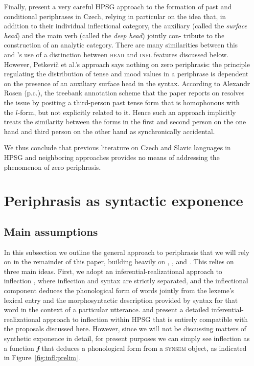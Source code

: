 \documentclass[output=paper]{langsci/langscibook}
\begin{document}
Finally, \citet{Petkevic15} present a very careful HPSG approach to the formation of past and conditional periphrases in Czech, relying in particular on the idea that, in addition to their individual inflectional category, the auxiliary (called the \emph{surface head}) and the main verb (called the \emph{deep head}) jointly con- tribute to the construction of an analytic category. There are many similarities between this and \citeauthor{Bonami14d}’s \citeyear{Bonami14d} use of a distinction between \textsc{head} and \textsc{infl} features discussed below. However,  Petkevič et al.’s approach  says nothing on zero periphrasis: the principle regulating the distribution of tense and mood values in a periphrase is dependent on the presence of an auxiliary surface head in the syntax. According to Alexandr Rosen (p.c.), the treebank annotation scheme that the paper reports on resolves the issue by positing a third-person past tense form that is homophonous with the $l$-form, but not explicitly related to it. Hence such an approach implicitly treats the similarity  between the forms in the first and second person on the one hand and third person on the other hand as synchronically accidental. 

We thus conclude that previous literature on Czech and Slavic languages in HPSG and neighboring approaches provides no means of addressing the phenomenon of zero periphrasis.

\section{Periphrasis as syntactic exponence}
\label{sec:ana}

\subsection{Main assumptions}\largerpage

In this subsection we outline the general approach to periphrasis that we will rely on in the remainder of this paper, building heavily on  \citet{Bonami13}, \citet{Bonami14d}, and \citet{Bonami16b}. This relies on three main ideas. First, we adopt an inferential-realizational approach to inflection \citep{Matthews72,Zwicky85,Anderson92,Aronoff94,Stump01}, where inflection and syntax are strictly separated, and the inflectional component deduces the phonological form of words jointly from the lexeme's lexical entry and the morphosyntactic description provided by syntax for that word in the context of a particular utterance. \citet{Crysmann14} and \citet{Bonami15b} present a detailed inferential-realizational approach to inflection within HPSG that is entirely compatible with the proposals discussed here. However, since we will not be discussing matters of synthetic exponence in detail, for present purposes we can simply see inflection as a function \textit{\textbf{f}} that deduces a phonological form from a \textsc{synsem} object, as indicated in Figure~\ref{fig:infl:prelim}.
\end{document}
